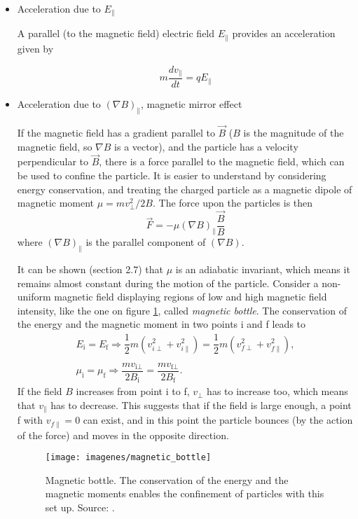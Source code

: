 \documentclass[a4paper,12pt,oneside]{book}
\begin{document}
\begin{itemize}

\item Acceleration due to $E_{\parallel}$

A parallel (to the magnetic field) electric field $E_{\parallel}$ provides an acceleration given by

\begin{equation}
m \dfrac{d v_{\parallel}}{dt}=q E_{\parallel}
\end{equation}


\item Acceleration due to $(\nabla B)_{\parallel}$, magnetic mirror effect

If the magnetic field has a gradient parallel to $\vec{B}$ ($B$ is the magnitude of the magnetic field, so $\nabla B$ is a vector), and the particle has a velocity perpendicular to $\vec{B}$, there is a force parallel to the magnetic field, which can be used to confine the particle. It is easier to understand by considering energy conservation, and treating the charged particle as a magnetic dipole of magnetic moment $\mu=m v_{\perp}^2/2 B$. The force upon the particles is then
%
\begin{equation}
\vec{F}=-\mu (\nabla B)_{\parallel} \dfrac{\vec{B}}{B}
\end{equation}
%
where $(\nabla B)_{\parallel}$ is the parallel component of $(\nabla B)$.
%

It can be shown \cite{Wesson} (section 2.7) that $\mu$ is an adiabatic invariant, which means it remains almost constant during the motion of the particle. Consider a non-uniform magnetic field displaying regions of low and high magnetic field intensity, like the one on figure \ref{fig mag bottle}, called \textit{magnetic bottle}. The conservation of the energy and the magnetic moment in two points i and f leads to
%
\begin{equation}\label{mirror conserv}
\begin{array}{c}
E_\text{i}=E_\text{f} \Rightarrow \dfrac{1}{2}m (v_{i \perp}^2+v_{i \parallel}^2)=\dfrac{1}{2}m (v_{f \perp}^2+v_{f \parallel}^2), \\
\\
\mu_\text{i}=\mu_\text{f} \Rightarrow \dfrac{mv_{\text{i} \perp}}{2B_\text{i}}=\dfrac{mv_{\text{f} \perp}}{2B_\text{f}}.
\end{array}
\end{equation}
%
If the field $B$ increases from point i to f, $v_{\perp}$ has to increase too, which means that $v_{\parallel}$ has to decrease. This suggests that if the field is large enough, a point f with $v_{f\parallel}=0$ can exist, and in this point the particle bounces (by the action of the force) and moves in the opposite direction.
%
\begin{figure}[htbp]
\centering
\texttt{[image: imagenes/magnetic\_bottle]}
\caption{Magnetic bottle. The conservation of the energy and the magnetic moments enables the confinement of particles with this set up. Source: \cite{Uni_physics}.}
\label{fig mag bottle}
\end{figure}


\end{itemize}
\end{document}
